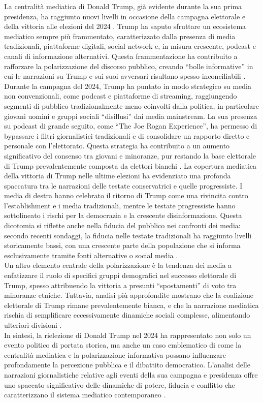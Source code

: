La centralità mediatica di Donald Trump, già evidente durante la sua prima presidenza, ha raggiunto nuovi livelli in occasione della campagna elettorale e della vittoria alle elezioni del 2024 \cite{lse2024}. Trump ha saputo sfruttare un ecosistema mediatico sempre più frammentato, caratterizzato dalla presenza di media tradizionali, piattaforme digitali, social network e, in misura crescente, podcast e canali di informazione alternativi. Questa frammentazione ha contribuito a rafforzare la polarizzazione del discorso pubblico, creando ``bolle informative'' in cui le narrazioni su Trump e sui suoi avversari risultano spesso inconciliabili \cite{pew2024}. Durante la campagna del 2024, Trump ha puntato in modo strategico su media non convenzionali, come podcast e piattaforme di streaming, raggiungendo segmenti di pubblico tradizionalmente meno coinvolti dalla politica, in particolare giovani uomini e gruppi sociali ``disillusi'' dai media mainstream. La sua presenza su podcast di grande seguito, come ``The Joe Rogan Experience'', ha permesso di bypassare i filtri giornalistici tradizionali e di consolidare un rapporto diretto e personale con l’elettorato. Questa strategia ha contribuito a un aumento significativo del consenso tra giovani e minoranze, pur restando la base elettorale di Trump prevalentemente composta da elettori bianchi \cite{newsweek2024}. La copertura mediatica della vittoria di Trump nelle ultime elezioni ha evidenziato una profonda spaccatura tra le narrazioni delle testate conservatrici e quelle progressiste. I media di destra hanno celebrato il ritorno di Trump come una rivincita contro l’establishment e i media tradizionali, mentre le testate progressiste hanno sottolineato i rischi per la democrazia e la crescente disinformazione. Questa dicotomia si riflette anche nella fiducia del pubblico nei confronti dei media: secondo recenti sondaggi, la fiducia nelle testate tradizionali ha raggiunto livelli storicamente bassi, con una crescente parte della popolazione che si informa esclusivamente tramite fonti alternative o social media \cite{pew2024}. \\
Un altro elemento centrale della polarizzazione è la tendenza dei media a enfatizzare il ruolo di specifici gruppi demografici nel successo elettorale di Trump, spesso attribuendo la vittoria a presunti ``spostamenti'' di voto tra minoranze etniche. Tuttavia, analisi più approfondite mostrano che la coalizione elettorale di Trump rimane prevalentemente bianca, e che la narrazione mediatica rischia di semplificare eccessivamente dinamiche sociali complesse, alimentando ulteriori divisioni \cite{georgetown2025}. \\
In sintesi, la rielezione di Donald Trump nel 2024 ha rappresentato non solo un evento politico di portata storica, ma anche un caso emblematico di come la centralità mediatica e la polarizzazione informativa possano influenzare profondamente la percezione pubblica e il dibattito democratico. L’analisi delle narrazioni giornalistiche relative agli eventi della sua campagna e presidenza offre uno spaccato significativo delle dinamiche di potere, fiducia e conflitto che caratterizzano il sistema mediatico contemporaneo \cite{faris2017}.